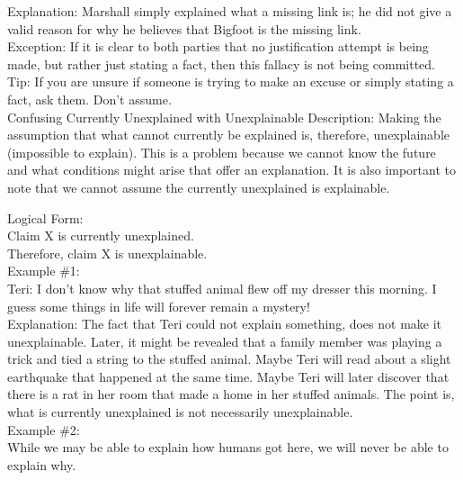 \documentclass[a4paper,12pt,single,pdftex]{scrbook}
\begin{document}
    
      Explanation: Marshall simply explained what a missing link is; he did not give a valid reason for why he believes that Bigfoot is the missing link.
    \\

    
      Exception: If it is clear to both parties that no justification attempt is being made, but rather just stating a fact, then this fallacy is not being committed.
    \\

    
      Tip: If you are unsure if someone is trying to make an excuse or simply stating a fact, ask them.  Don’t assume.
    \\

  

Confusing Currently Unexplained with Unexplainable
    Description: Making the assumption that what cannot currently be explained is, therefore, unexplainable (impossible to explain). This is a problem because we cannot know the future and what conditions might arise that offer an explanation. It is also important to note that we cannot assume the currently unexplained is explainable.

    
      Logical Form:
    \\

    
      Claim X is currently unexplained.
    \\

    
      Therefore, claim X is unexplainable.
    \\

    
      Example \#1:
    \\

    
      Teri: I don't know why that stuffed animal flew off my dresser this morning. I guess some things in life will forever remain a mystery!
    \\

    
      Explanation: The fact that Teri could not explain something, does not make it unexplainable. Later, it might be revealed that a family member was playing a trick and tied a string to the stuffed animal. Maybe Teri will read about a slight earthquake that happened at the same time. Maybe Teri will later discover that there is a rat in her room that made a home in her stuffed animals. The point is, what is currently unexplained is not necessarily unexplainable.
    \\

    
      Example \#2:
    \\

    
      While we may be able to explain how humans got here, we will never be able to explain why.
    \\
\end{document}
